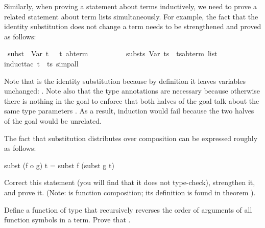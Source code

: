 \begin{isabellebody}
\begin{isamarkuptext}
Similarly, when proving a statement about terms inductively, we need
to prove a related statement about term lists simultaneously. For example,
the fact that the identity substitution does not change a term needs to be
strengthened and proved as follows:%
\end{isamarkuptext}%
\ {\isachardoublequote}subst\ \ Var\ t\ \ {\isacharequal}\ {\isacharparenleft}t\ {\isacharcolon}{\isacharcolon}{\isacharparenleft}{\isacharprime}a{\isacharcomma}{\isacharprime}b{\isacharparenright}term{\isacharparenright}\ \ {\isasymand}\isanewline
\ \ \ \ \ \ \ \ substs\ Var\ ts\ {\isacharequal}\ {\isacharparenleft}ts{\isacharcolon}{\isacharcolon}{\isacharparenleft}{\isacharprime}a{\isacharcomma}{\isacharprime}b{\isacharparenright}term\ list{\isacharparenright}{\isachardoublequote}\isanewline
{}induct{\isacharunderscore}tac\ t\ \ ts{\isacharcomma}\ simp{\isacharunderscore}all{\isacharparenright}%
\begin{isamarkuptext}%
\noindent
Note that  is the identity substitution because by definition it
leaves variables unchanged: . Note also
that the type annotations are necessary because otherwise there is nothing in
the goal to enforce that both halves of the goal talk about the same type
parameters . As a result, induction would fail
because the two halves of the goal would be unrelated.

\begin{exercise}
The fact that substitution distributes over composition can be expressed
roughly as follows:
\begin{ttbox}
subst (f o g) t = subst f (subst g t)
\end{ttbox}
Correct this statement (you will find that it does not type-check),
strengthen it, and prove it. (Note:  is function composition;
its definition is found in theorem ).
\end{exercise}
\begin{exercise}\label{ex:trev-trev}
  Define a function  of type  that
  recursively reverses the order of arguments of all function symbols in a
  term. Prove that .
\end{exercise}


\end{isamarkuptext}
\end{isabellebody}
